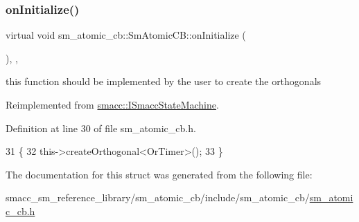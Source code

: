 \subsubsection{\texorpdfstring{on\+Initialize()}{onInitialize()}}
{\footnotesize\ttfamily virtual void sm\+\_\+atomic\+\_\+cb\+::\+Sm\+Atomic\+C\+B\+::on\+Initialize (\begin{DoxyParamCaption}{ }\end{DoxyParamCaption})\hspace{0.3cm}{\ttfamily [inline]}, {\ttfamily [override]}, {\ttfamily [virtual]}}



this function should be implemented by the user to create the orthogonals 



Reimplemented from \hyperlink{classsmacc_1_1ISmaccStateMachine_ac2982c6c8283663e5e1e8a7c82f511ec}{smacc\+::\+I\+Smacc\+State\+Machine}.



Definition at line 30 of file sm\+\_\+atomic\+\_\+cb.\+h.


\begin{DoxyCode}
31     \{
32         this->createOrthogonal<OrTimer>();
33     \}
\end{DoxyCode}


The documentation for this struct was generated from the following file\+:\begin{DoxyCompactItemize}
\item 
smacc\+\_\+sm\+\_\+reference\+\_\+library/sm\+\_\+atomic\+\_\+cb/include/sm\+\_\+atomic\+\_\+cb/\hyperlink{sm__atomic__cb_8h}{sm\+\_\+atomic\+\_\+cb.\+h}\end{DoxyCompactItemize}
